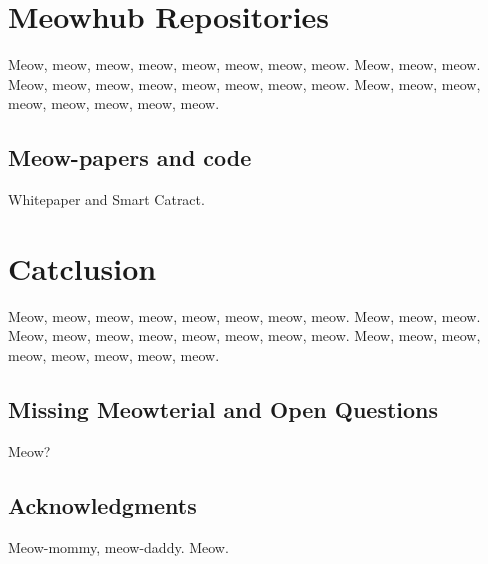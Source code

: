 \documentclass[9pt,oneside]{amsart}
\newcommand*\lipsumeow{Meow, meow, meow, meow, meow, meow, meow, meow.  Meow, meow, meow. Meow, meow, meow, meow, meow, meow, meow, meow. Meow, meow, meow, meow, meow, meow, meow, meow. }
\begin{document}
\begin{multicols}{2}
\section{Meowhub Repositories}\label{sec:protocol} \lipsumeow{}

\subsection{Meow-papers and code}\label{subsec:exchange}
Whitepaper and Smart Catract. \cite{github-compuglobal}


\section{Catclusion} \label{ch:conclusion}

    \lipsumeow{}

\subsection{Missing Meowterial and Open Questions}\label{open-questions-and-further-work}
 
 Meow?

\subsection{Acknowledgments}

 Meow-mommy, meow-daddy. Meow. 

 
{}
\nocite{*}


\end{multicols}


\appendix
 
 
 
 
 
\end{document}
